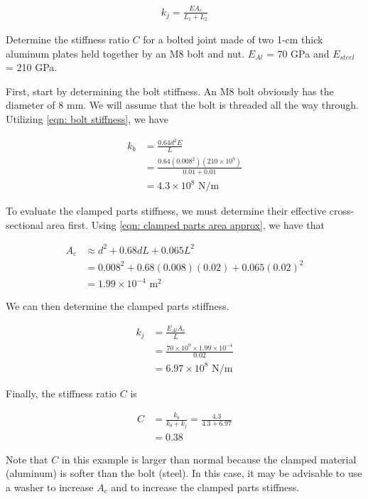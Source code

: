 \documentclass[
10pt,
a4paper,
openany,
svgnames,
]{book}
\begin{document}
\begin{align}
  k_j = \frac{EA_c}{L_1+L_2}
\end{align}

\begin{example} Determine the stiffness ratio $C$ for a bolted joint made of two 1-cm thick aluminum plates held together by an M8 bolt and nut. $E_{Al}$ = 70 GPa and $E_{steel}$ = 210 GPa.
\end{example}

\begin{solution}
  First, start by determining the bolt stiffness. An M8 bolt obviously has the diameter of 8 mm. We will assume that the bolt is threaded all the way through. Utilizing \cref{eqn: bolt stiffness}, we have

  \begin{align*}
    k_b &= \frac{0.64d^2E}{L} \\
        &= \frac{0.64 (0.008^2)(210 \times 10^9)}{0.01+0.01} \\
        &= 4.3 \times 10^8 \text{ N/m}
  \end{align*}
  
  To evaluate the clamped parts stiffness, we must determine their effective cross-sectional area first. Using \cref{eqn: clamped parts area approx}, we have that

  \begin{align*}
    A_c &\approx d^2 + 0.68dL + 0.065L^2 \\
        &= 0.008^2 + 0.68(0.008)(0.02) + 0.065(0.02)^2 \\
        &= 1.99 \times 10^{-4} \text{ m}^2
  \end{align*}

  We can then determine the clamped parts stiffness.

  \begin{align*}
    k_j &= \frac{E_{Al}A_c}{L} \\
        &= \frac{70 \times 10^9 \times 1.99 \times 10^{-4}}{0.02} \\
        &= 6.97 \times 10^8 \text{ N/m}
  \end{align*}

  Finally, the stiffness ratio $C$ is

  \begin{align*}
    C & = \frac{k_b}{k_b + k_j} = \frac{4.3}{4.3 + 6.97} \\
      &= 0.38
  \end{align*}

  Note that $C$ in this example is larger than normal because the clamped material (aluminum) is softer than the bolt (steel). In this case, it may be advisable to use a washer to increase $A_c$ and to increase the clamped parts stiffness.
\end{solution}
\end{document}
